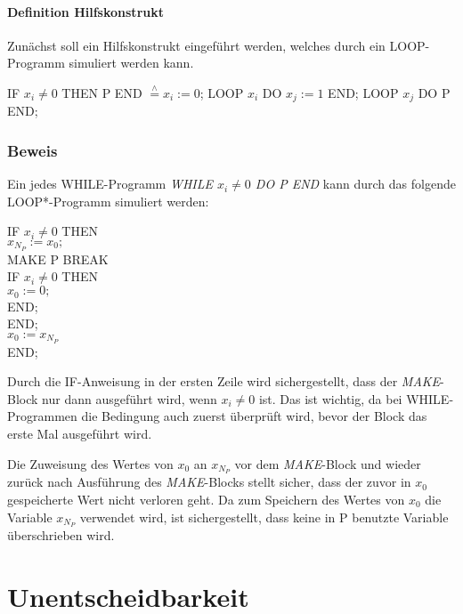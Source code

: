 \documentclass[10pt,leqno ]{article}
\newcommand{\estimates}{\overset{\scriptscriptstyle\wedge}{=}}
\begin{document}
\paragraph{Definition Hilfskonstrukt}
Zunächst soll ein Hilfskonstrukt eingeführt werden, welches durch ein LOOP-Programm simuliert werden kann.
\begin{flushleft}
    IF $x_i \neq 0$ THEN P END $\estimates x_i := 0$; LOOP $x_i$ DO $x_j := 1$ END; LOOP $x_j$ DO P END;
\end{flushleft}

\subsubsection*{Beweis}
Ein jedes WHILE-Programm \textit{WHILE $x_i \neq 0$ DO P END} kann durch das folgende LOOP*-Programm simuliert werden:

\begin{flushleft}
    IF $x_i \neq 0$ THEN \\ 
    \quad $x_{N_P} := x_0;$ \\ 
    \quad MAKE P  BREAK \\
    \qquad IF $x_i \neq 0$ THEN \\ 
    \quad \qquad $x_0 := 0;$ \\
    \qquad END; \\
    \quad END; \\ 
    \quad $x_0 := x_{N_P}$ \\
    END;
\end{flushleft}

Durch die IF-Anweisung in der ersten Zeile wird sichergestellt, dass der \textit{MAKE}-Block nur dann ausgeführt wird, wenn $x_i \neq 0$ ist. Das ist wichtig, da bei WHILE-Programmen die Bedingung auch zuerst überprüft wird, bevor der Block das erste Mal ausgeführt wird.

Die Zuweisung des Wertes von $x_0$ an $x_{N_P}$ vor dem \textit{MAKE}-Block und wieder zurück nach Ausführung des \textit{MAKE}-Blocks stellt sicher, dass der zuvor in $x_0$ gespeicherte Wert nicht verloren geht. Da zum Speichern des Wertes von $x_0$ die Variable $x_{N_P}$ verwendet wird, ist sichergestellt, dass keine in P benutzte Variable überschrieben wird.

\pagebreak

\section{Unentscheidbarkeit}
\end{document}
